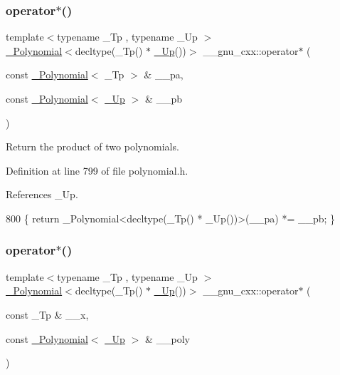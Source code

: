 \subsubsection{\texorpdfstring{operator$\ast$()}{operator*()}\hspace{0.1cm}{\footnotesize\ttfamily [2/3]}}
{\footnotesize\ttfamily template$<$typename \+\_\+\+Tp , typename \+\_\+\+Up $>$ \\
\hyperlink{class____gnu__cxx_1_1__Polynomial}{\+\_\+\+Polynomial}$<$decltype(\+\_\+\+Tp() $\ast$ \hyperlink{namespace____gnu__cxx_ab693ea357b6429b331e0bf09f9442385}{\+\_\+\+Up}())$>$ \+\_\+\+\_\+gnu\+\_\+cxx\+::operator$\ast$ (\begin{DoxyParamCaption}\item[{const \hyperlink{class____gnu__cxx_1_1__Polynomial}{\+\_\+\+Polynomial}$<$ \+\_\+\+Tp $>$ \&}]{\+\_\+\+\_\+pa,  }\item[{const \hyperlink{class____gnu__cxx_1_1__Polynomial}{\+\_\+\+Polynomial}$<$ \hyperlink{namespace____gnu__cxx_ab693ea357b6429b331e0bf09f9442385}{\+\_\+\+Up} $>$ \&}]{\+\_\+\+\_\+pb }\end{DoxyParamCaption})\hspace{0.3cm}{\ttfamily [inline]}}

Return the product of two polynomials. 

Definition at line 799 of file polynomial.\+h.



References \+\_\+\+Up.


\begin{DoxyCode}
800     \{ \textcolor{keywordflow}{return} \_Polynomial<decltype(\_Tp() * \_Up())>(\_\_pa) *= \_\_pb; \}
\end{DoxyCode}
\mbox{\label{namespace____gnu__cxx_ac79cfe2d37e5d8116fcf51911c21c253}} 
\subsubsection{\texorpdfstring{operator$\ast$()}{operator*()}\hspace{0.1cm}{\footnotesize\ttfamily [3/3]}}
{\footnotesize\ttfamily template$<$typename \+\_\+\+Tp , typename \+\_\+\+Up $>$ \\
\hyperlink{class____gnu__cxx_1_1__Polynomial}{\+\_\+\+Polynomial}$<$decltype(\+\_\+\+Tp() $\ast$ \hyperlink{namespace____gnu__cxx_ab693ea357b6429b331e0bf09f9442385}{\+\_\+\+Up}())$>$ \+\_\+\+\_\+gnu\+\_\+cxx\+::operator$\ast$ (\begin{DoxyParamCaption}\item[{const \+\_\+\+Tp \&}]{\+\_\+\+\_\+x,  }\item[{const \hyperlink{class____gnu__cxx_1_1__Polynomial}{\+\_\+\+Polynomial}$<$ \hyperlink{namespace____gnu__cxx_ab693ea357b6429b331e0bf09f9442385}{\+\_\+\+Up} $>$ \&}]{\+\_\+\+\_\+poly }\end{DoxyParamCaption})\hspace{0.3cm}{\ttfamily [inline]}}



